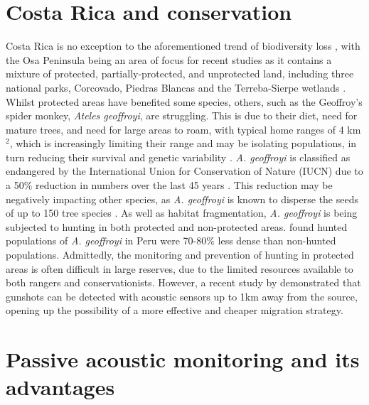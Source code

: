 \section{Costa Rica and conservation}

Costa Rica is no exception to the aforementioned trend of biodiversity loss \citep{Hobinger2012}, with the Osa Peninsula being an area of focus for recent studies as it contains a mixture of protected, partially-protected, and unprotected land, including three national parks, Corcovado, Piedras Blancas and the Terreba-Sierpe wetlands  \citep{Lawson2019}. Whilst protected areas have benefited some species, others, such as the Geoffroy’s spider monkey, \textit{Ateles geoffroyi}, are struggling. This is due to their diet, need for mature trees, and need for large areas to roam, with typical home ranges of 4 km$^2$, which is increasingly limiting their range and may be isolating populations, in turn reducing their survival and genetic variability \citep{Chapman1989}. \textit{A. geoffroyi} is classified as endangered by the International Union for Conservation of Nature (IUCN) due to a 50\% reduction in numbers over the last 45 years \citep{Cuaron2008}. This reduction may be negatively impacting other species, as \textit{A. geoffroyi} is known to disperse the seeds of up to 150 tree species \citep{VanRoosmalen1985, Pacheco2000}. As well as habitat fragmentation, \textit{A. geoffroyi} is being subjected to hunting in both protected and non-protected areas. \cite{Aquino2013} found hunted populations of \textit{A. geoffroyi} in Peru were 70-80\% less dense than non-hunted populations. Admittedly, the monitoring and prevention of hunting in protected areas is often difficult in large reserves, due to the limited resources available to both rangers and conservationists. However, a recent study by \cite{Hill2018} demonstrated that gunshots can be detected with acoustic sensors up to 1km away from the source, opening up the possibility of a more effective and cheaper migration strategy.

\section{Passive acoustic monitoring and its advantages}

